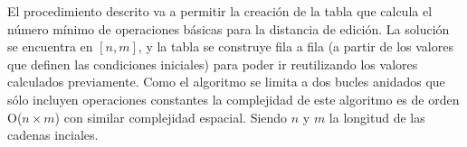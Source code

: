 El procedimiento descrito  va a permitir la creación de la tabla  que calcula el
número mínimo de operaciones básicas para la distancia de edición. La solución se encuentra en $[n,m]$, y la
 tabla se construye fila a fila (a partir de los valores que definen las condiciones
 iniciales) para poder ir reutilizando los valores calculados previamente. 
Como el algoritmo se limita a dos bucles anidados que sólo incluyen
operaciones constantes la complejidad de este algoritmo es de orden O($n\times m$) con similar complejidad espacial. Siendo $n$ y $m$ la longitud de las cadenas inciales. 